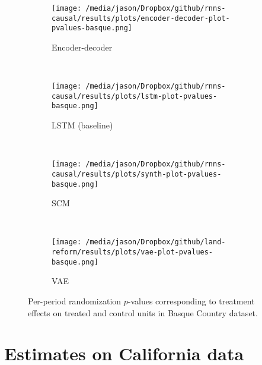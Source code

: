 \documentclass[12pt]{article}
\begin{document}
\begin{figure*}[htbp]
    \centering
    \begin{subfigure}[t]{0.5\textwidth}
        \centering
        \texttt{[image: /media/jason/Dropbox/github/rnns-causal/results/plots/encoder-decoder-plot-pvalues-basque.png]}
        \caption{Encoder-decoder}
    \end{subfigure}%
        ~ 
    \begin{subfigure}[t]{0.5\textwidth}
        \centering
        \texttt{[image: /media/jason/Dropbox/github/rnns-causal/results/plots/lstm-plot-pvalues-basque.png]}
        \caption{LSTM (baseline)}
    \end{subfigure}
        ~ 
    \begin{subfigure}[t]{0.5\textwidth}
        \centering
        \texttt{[image: /media/jason/Dropbox/github/rnns-causal/results/plots/synth-plot-pvalues-basque.png]}
        \caption{SCM}
     \end{subfigure}%
                ~ 
     \begin{subfigure}[t]{0.5\textwidth}
       	\centering
       	\texttt{[image: /media/jason/Dropbox/github/land-reform/results/plots/vae-plot-pvalues-basque.png]}
       	\caption{VAE}
    \end{subfigure}
    \caption{Per-period randomization $p$-values corresponding to treatment effects on treated and control units in Basque Country dataset. \label{basque-plot-pvalues}}
\end{figure*}

\section{Estimates on California data}
\end{document}
